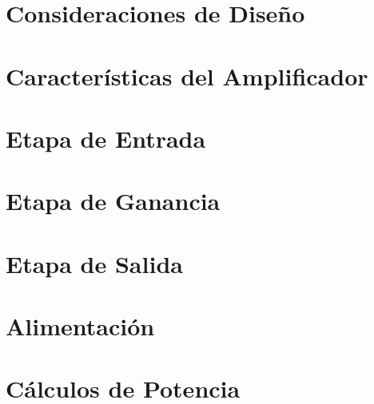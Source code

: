 






\vspace{3.3cm}
\tableofcontents
\newpage

\null
\vspace{8.5cm}
\section*{Consideraciones de Diseño}
	\label{consideraciones}
		
	
\newpage
\null
\vspace{4.75cm}
\section{Características del Amplificador}
	\label{caracteristicas}
	

\newpage

\section{Etapa de Entrada}
	\label{inputstage}
	
		
\section{Etapa de Ganancia}
	\label{gainstage}
	
	
\section{Etapa de Salida}
	\label{outputstage}
	
	
\section{Alimentación}
	\label{alimentacion}
	

\section{Cálculos de Potencia}
	\label{calculospotencia}
		
	
